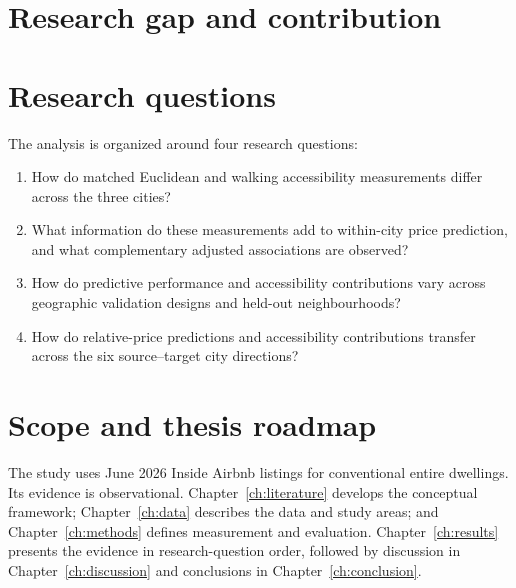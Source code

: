 \documentclass[11pt,a4paper,oneside,openany]{memoir}
\begin{document}
\section{Research gap and contribution}
\label{sec:gap}

\section{Research questions}
\label{sec:research-questions}
The analysis is organized around four research questions:
\begin{enumerate}
  \item[RQ1.] How do matched Euclidean and walking accessibility measurements
  differ across the three cities?
  \item[RQ2.] What information do these measurements add to within-city price
  prediction, and what complementary adjusted associations are observed?
  \item[RQ3.] How do predictive performance and accessibility contributions
  vary across geographic validation designs and held-out neighbourhoods?
  \item[RQ4.] How do relative-price predictions and accessibility contributions
  transfer across the six source--target city directions?
\end{enumerate}

\section{Scope and thesis roadmap}
\label{sec:roadmap}
The study uses June 2026 Inside Airbnb listings for conventional entire
dwellings. Its evidence is observational. Chapter~\ref{ch:literature} develops
the conceptual framework; Chapter~\ref{ch:data} describes the data and study
areas; and Chapter~\ref{ch:methods} defines measurement and evaluation.
Chapter~\ref{ch:results} presents the evidence in research-question order,
followed by discussion in Chapter~\ref{ch:discussion} and conclusions in
Chapter~\ref{ch:conclusion}.

\end{document}
